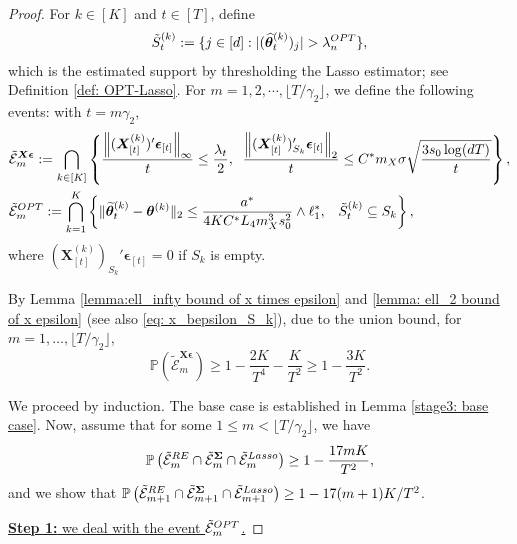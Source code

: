 \documentclass[10pt,a4paper]{amsart}
\newcommand{\Pro}{\mathbb{P}}
\newcommand{\bSigma}{\boldsymbol{\Sigma}}
\newcommand{\bX}{\boldsymbol{X}}
\newcommand{\bd}[1]{\boldsymbol{#1}}
\newcommand{\bepsilon}{\bd{\epsilon}}
\newcommand{\btheta}{\boldsymbol{\theta}}
\newcommand{\hbtheta}{\widehat{\boldsymbol{\theta}}}
\newcommand{\hdlambda}{\lambda^{\textup{OPT}}}
\newcommand{\mE}{\mathcal{E}}
\newcommand{\tS}{\tilde{S}}
\newcommand{\tbtheta}{\widetilde{\boldsymbol{\theta}}}
\begin{document}
\begin{proof}
For $k \in [K]$ and $t \in [T]$, define
\begin{align*} 
    \tS_t^{(k)} := \{j \in [d]: |(\hbtheta_{t}^{(k)})_j| > \hdlambda_n\},
\end{align*}
which is the estimated support by thresholding the Lasso estimator; see Definition \ref{def: OPT-Lasso}. 
For $m=1,2,\cdots, \lfloor T/\gamma_2 \rfloor$, we define the following events: with $t = m\gamma_2$,
\begin{align}\label{def:stage3_more_events}
\begin{split}
       & \tilde{\mE}_m^{\bX\bepsilon} := \bigcap_{k\in [K]} \left\{\frac{\left\|({\bX_{[t]}^{(k)}})' \bepsilon_{[t]}\right\|_{\infty}}{t} \le \frac{\lambda_t}{2},\;\;
\frac{\left\|(\bX_{[t]}^{(k)})_{S_k}'\bepsilon_{[t]}\right\|_2 }{t}\le C^*m_X\sigma\sqrt{\frac{3s_0\log (dT)}{t}}\right\},  \\
   & \tilde{\mE}_m^{\textup{OPT}} := \bigcap_{k = 1}^{K}\left\{\|\tbtheta_t^{(k)}-\btheta^{(k)}\|_2 \le \frac{a^*}{4KC^*L_4 m_X^3 s_0^2} \wedge \ell_1^*, \;\;\; \tS_t^{(k)}\subseteq S_k \right\},
      \end{split} 
\end{align}
where $(\bX_{[t]}^{(k)})_{S_k}'\bepsilon_{[t]} = 0$ if $S_k$ is empty.

By Lemma \ref{lemma:ell_infty bound of x times epsilon} and \ref{lemma: ell_2 bound of x epsilon} (see also \eqref{eq: x_bepsilon_S_k}), due to the union bound, for $m = 1,\ldots,\lfloor T/\gamma_2 \rfloor$,
\begin{equation}\label{eq: stage 3 E infty prob}
    \Pro(\tilde{\mE}_{m}^{\bX\bepsilon})\ge 1- \frac{2K}{T^4} - \frac{K}{T^2} \geq 1- \frac{3K}{T^2}.
\end{equation}

We proceed by induction. The base case is established in Lemma  \ref{stage3: base case}. Now,   assume that for some $1\leq m < \lfloor T/\gamma_2 \rfloor$, we have 
\begin{align}
    \label{stage 3:inductive_hypothesis}
\Pro\left(\tilde{\mE}_m^{\textup{RE}} \cap \tilde{\mE}_m^{\bSigma} \cap  \tilde{\mE}_m^{\textup{Lasso}}\right) \geq 1-\frac{17mK}{T^2},
\end{align}
and we show that $\Pro\left(\tilde{\mE}_{m+1}^{\textup{RE}} \cap \tilde{\mE}_{m+1}^{\bSigma} \cap  \tilde{\mE}_{m+1}^{\textup{Lasso}}\right) \geq 1-{17(m+1)K}/{T^2}$.

\medskip
\noindent \underline{\textbf{Step 1:} we deal with the event 
$\tilde{\mE}_{m}^{\textup{OPT}}$.}


\end{proof}
\end{document}
